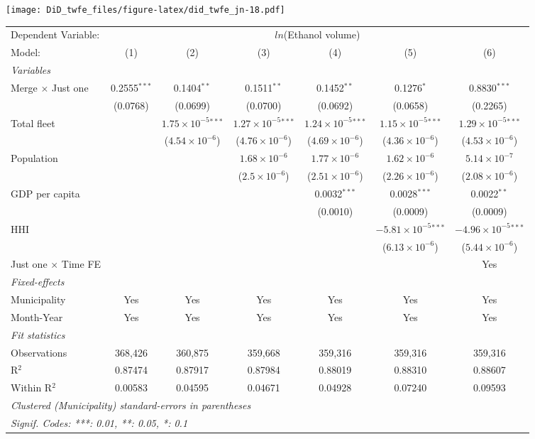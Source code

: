 \documentclass[
]{article}
\begin{document}
\texttt{[image: DiD\_twfe\_files/figure-latex/did\_twfe\_jn-18.pdf]}

\begin{tabular}{lcccccc}
\tabularnewline\midrule\midrule
Dependent Variable:&\multicolumn{6}{c}{$ln$(Ethanol volume)}\\
Model:&(1) & (2) & (3) & (4) & (5) & (6)\\
\midrule \emph{Variables}&   &   &   &   &   &  \\
Merge $\times $ Just one & 0.2555$^{***}$ & 0.1404$^{**}$ & 0.1511$^{**}$ & 0.1452$^{**}$ & 0.1276$^{*}$ & 0.8830$^{***}$\\
  &(0.0768) & (0.0699) & (0.0700) & (0.0692) & (0.0658) & (0.2265)\\
Total fleet &    & $1.75\times 10^{-5}$$^{***}$ & $1.27\times 10^{-5}$$^{***}$ & $1.24\times 10^{-5}$$^{***}$ & $1.15\times 10^{-5}$$^{***}$ & $1.29\times 10^{-5}$$^{***}$\\
  &   & ($4.54\times 10^{-6}$) & ($4.76\times 10^{-6}$) & ($4.69\times 10^{-6}$) & ($4.36\times 10^{-6}$) & ($4.53\times 10^{-6}$)\\
Population &    &    & $1.68\times 10^{-6}$ & $1.77\times 10^{-6}$ & $1.62\times 10^{-6}$ & $5.14\times 10^{-7}$\\
  &   &    & ($2.5\times 10^{-6}$) & ($2.51\times 10^{-6}$) & ($2.26\times 10^{-6}$) & ($2.08\times 10^{-6}$)\\
GDP per capita &    &    &    & 0.0032$^{***}$ & 0.0028$^{***}$ & 0.0022$^{**}$\\
  &   &    &    & (0.0010) & (0.0009) & (0.0009)\\
HHI &    &    &    &    & $-5.81\times 10^{-5}$$^{***}$ & $-4.96\times 10^{-5}$$^{***}$\\
  &   &    &    &    & ($6.13\times 10^{-6}$) & ($5.44\times 10^{-6}$)\\
Just one $\times$ Time FE &  &  &  &  &  & Yes\\
\midrule \emph{Fixed-effects}&   &   &   &   &   &  \\
Municipality & Yes & Yes & Yes & Yes & Yes & Yes\\
Month-Year & Yes & Yes & Yes & Yes & Yes & Yes\\
\midrule \emph{Fit statistics}&  & & & & & \\
Observations & 368,426&360,875&359,668&359,316&359,316&359,316\\
R$^2$ & 0.87474&0.87917&0.87984&0.88019&0.88310&0.88607\\
Within R$^2$ & 0.00583&0.04595&0.04671&0.04928&0.07240&0.09593\\
\midrule\midrule\multicolumn{7}{l}{\emph{Clustered (Municipality) standard-errors in parentheses}}\\
\multicolumn{7}{l}{\emph{Signif. Codes: ***: 0.01, **: 0.05, *: 0.1}}\\
\end{tabular}
\end{document}
